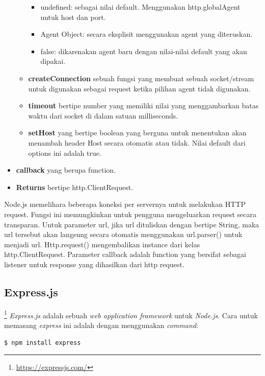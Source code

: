 \begin{itemize}
\begin{itemize}
		\begin{itemize}
			\item undefined: sebagai nilai default. Menggunakan http.globalAgent untuk host dan port. 
			\item Agent Object: secara eksplisit menggunakan agent yang diteruskan. 
			\item false: dikarenakan agent baru dengan nilai-nilai default yang akan dipakai. 
		\end{itemize}		 
		\item \textbf{createConnection} sebuah fungsi yang membuat sebuah socket/stream untuk digunakan sebagai request ketika pilihan agent tidak digunakan. 
		\item \textbf{timeout} bertipe number yang memiliki nilai yang menggambarkan batas waktu dari socket di dalam satuan milliseconds. 
		\item \textbf{setHost} yang bertipe boolean yang berguna untuk menentukan akan menambah header Host secara otomatis atau tidak. Nilai default dari options ini adalah true. 
	\end{itemize}
	\item \textbf{callback} yang berupa function. 
	\item \textbf{Returns} bertipe http.ClientRequest. 
\end{itemize}

Node.js memelihara beberapa koneksi per servernya untuk melakukan HTTP request. Fungsi ini memungkinkan untuk pengguna mengeluarkan request secara transparan. Untuk parameter url, jika url dituliskan dengan bertipe String, maka url tersebut akan langsung secara otomatis menggunakan url.parser() untuk menjadi url. Http.request() mengembalikan instance dari kelas http.ClientRequest. Parameter callback adalah function yang bersifat sebagai listener untuk response yang dihasilkan dari http request. 

\subsection{Express.js}\footnote{\url{https://expressjs.com/}}
\label{express.js}
\textit{Express.js} adalah sebuah \textit{web application framework} untuk \textit{Node.js}. Cara untuk memasang \textit{express} ini adalah dengan menggunakan \textit{command}:

\begin{lstlisting}
$ npm install express 
\end{lstlisting}

